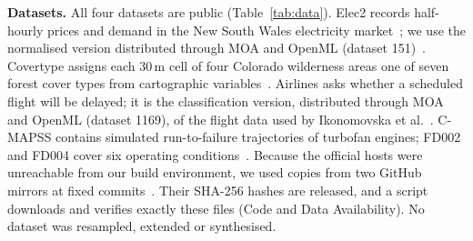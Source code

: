 \IfFileExists{IEEEtran.cls}{\documentclass[journal]{IEEEtran}\newcommand{\ieeemode}{}}{\documentclass[10pt,twocolumn,letterpaper]{article}\usepackage[margin=0.72in,columnsep=0.22in]{geometry}}
\begin{document}
\noindent\textbf{Datasets.} All four datasets are public (Table~\ref{tab:data}). Elec2 records half-hourly prices and demand in the New South Wales electricity market~\cite{harries1999elec}; we use the normalised version distributed through MOA and OpenML (dataset 151)~\cite{moadatasets,openml151,vanschoren2013openml}. Covertype assigns each 30\,m cell of four Colorado wilderness areas one of seven forest cover types from cartographic variables~\cite{blackard2000covtype,ucicovtype}. Airlines asks whether a scheduled flight will be delayed; it is the classification version, distributed through MOA and OpenML (dataset 1169), of the flight data used by Ikonomovska et al.~\cite{ikonomovska2011fimt,gomes2017arf,openml1169}. C-MAPSS contains simulated run-to-failure trajectories of turbofan engines; FD002 and FD004 cover six operating conditions~\cite{saxena2008cmapss,nasacmapss}. Because the official hosts were unreachable from our build environment, we used copies from two GitHub mirrors at fixed commits~\cite{streamingdatasets,cmapssmirror}. Their SHA-256 hashes are released, and a script downloads and verifies exactly these files (Code and Data Availability). No dataset was resampled, extended or synthesised.
\end{document}
